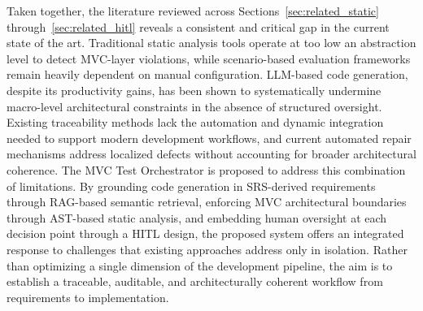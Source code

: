 Taken together, the literature reviewed across
Sections~\ref{sec:related_static} through~\ref{sec:related_hitl}
reveals a consistent and critical gap in the current state of the art.
Traditional static analysis tools operate at too low an abstraction
level to detect MVC-layer violations, while scenario-based evaluation
frameworks remain heavily dependent on manual configuration. LLM-based
code generation, despite its productivity gains, has been shown to
systematically undermine macro-level architectural constraints in the
absence of structured oversight. Existing traceability methods lack
the automation and dynamic integration needed to support modern
development workflows, and current automated repair mechanisms address
localized defects without accounting for broader architectural
coherence. The MVC Test Orchestrator is proposed to address this
combination of limitations. By grounding code generation in
SRS-derived requirements through RAG-based semantic retrieval,
enforcing MVC architectural boundaries through AST-based static
analysis, and embedding human oversight at each decision point through
a HITL design, the proposed system offers an integrated response to
challenges that existing approaches address only in isolation. Rather
than optimizing a single dimension of the development pipeline, the
aim is to establish a traceable, auditable, and architecturally
coherent workflow from requirements to implementation.